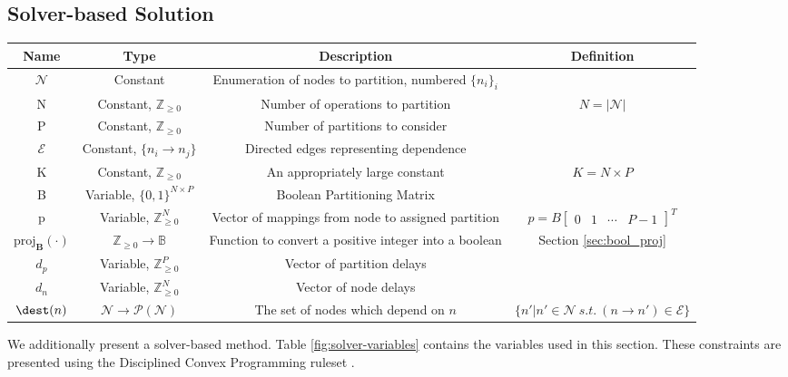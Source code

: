\subsection{Solver-based Solution}
\newcommand{\projb}[1]{\text{proj}_\mathbf{B}(#1)}
\newcommand{\nnint}{\mathbb{Z}_{\ge 0}}
\newcommand{\ind}[1]{\mathbb{1}[#1]}

\begin{figure*}
	\begin{tabular}{c | c | c | c}
		Name & Type & Description & Definition\\\hline
		$\mathcal{N}$ & Constant & Enumeration of nodes to partition, numbered $\{n_i\}_i$ & \\
		N & Constant, $\nnint$ & Number of operations to partition & $N = |\mathcal{N}|$\\
		P & Constant, $\nnint$ & Number of partitions to consider &\\
		$\mathcal{E}$ & Constant, $\{n_i \to n_j\}$& Directed edges representing dependence & \\
		K & Constant, $\nnint$ & An appropriately large constant & $K = N \times P$\\
		B & Variable, $\{0, 1\}^{N \times P}$ & Boolean Partitioning Matrix&\\
		p & Variable, $\nnint^N$ & Vector of mappings from node to assigned partition& $p = B \begin{bmatrix} 0 & 1 & \cdots & P-1\end{bmatrix}^T$\\
		$\projb{\cdot}$ & $\nnint \to \mathbb{B}$ & Function to convert a positive integer into a boolean& Section \ref{sec:bool_proj}\\
		$d_p$ & Variable, $\nnint^P$ & Vector of partition delays & \\
		$d_n$ & Variable, $\nnint^N$ & Vector of node delays & \\
		$\dest(n)$ & $\mathcal{N} \to \mathcal{P}(\mathcal{N})$& The set of nodes which depend on $n$& $\{n' | n' \in \mathcal{N}\ s.t.\ (n \to n') \in \mathcal{E}\}$
	\end{tabular}
	\caption{Names and definitions used in the solver-based partitioning.}
	\label{fig:solver-variables}
\end{figure*}

We additionally present a solver-based method. Table \ref{fig:solver-variables} contains the variables used in this section. These constraints are presented using the Disciplined Convex Programming ruleset \cite{DCP, DCP-online}.

